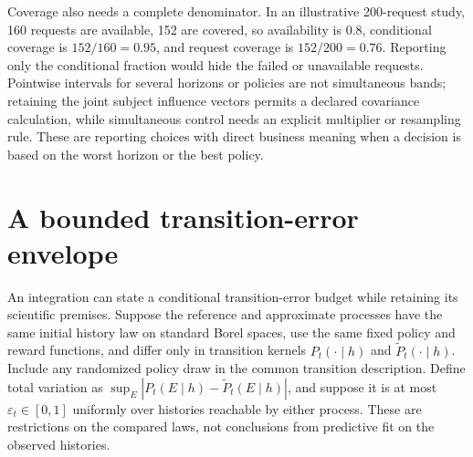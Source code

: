 Coverage also needs a complete denominator. In an illustrative 200-request
study, 160 requests are available, 152 are covered, so availability is $0.8$,
conditional coverage is $152/160=0.95$, and request coverage is $152/200=0.76$.
Reporting only the conditional fraction would hide the failed or unavailable
requests. Pointwise intervals for several horizons or policies are not
simultaneous bands; retaining the joint subject influence vectors permits a
declared covariance calculation, while simultaneous control needs an explicit
multiplier or resampling rule. These are reporting choices with direct business
meaning when a decision is based on the worst horizon or the best policy.

\section{A bounded transition-error envelope}
\label{exec17:s5-error}

An integration can state a conditional transition-error budget while retaining
its scientific premises. Suppose the reference and approximate processes have
the same initial history law on standard Borel spaces, use the same fixed
policy and reward functions, and differ only in transition kernels
$P_t(\cdot\mid h)$ and $\widetilde P_t(\cdot\mid h)$. Include any randomized
policy draw in the common transition description. Define total variation as
$\sup_E|P_t(E\mid h)-\widetilde P_t(E\mid h)|$, and suppose it is at most
$\varepsilon_t\in[0,1]$ uniformly over histories reachable by either process.
These are restrictions on the compared laws, not conclusions from predictive
fit on the observed histories.

